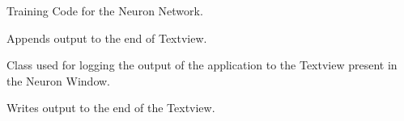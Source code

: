 \documentclass[letterpaper,10pt,english]{sphinxmanual}
\begin{document}
\begin{fulllineitems}
\begin{fulllineitems}
\end{fulllineitems}



\begin{fulllineitems}
\label{index:neuron.neuron.start_training}
Training Code for the Neuron Network.

\end{fulllineitems}



\begin{fulllineitems}
\label{index:neuron.neuron.write_neuron}
Appends output to the end of Textview.

\end{fulllineitems}


\end{fulllineitems}



\begin{fulllineitems}
\label{index:neuron.Neuron_TextViewOutput}
Class used for logging the output of
the application to the Textview present in 
the Neuron Window.


\begin{fulllineitems}
\label{index:neuron.Neuron_TextViewOutput.write}
Writes output to the end of the Textview.

\end{fulllineitems}


\end{fulllineitems}

\label{index:module-adv_train}
\end{document}

